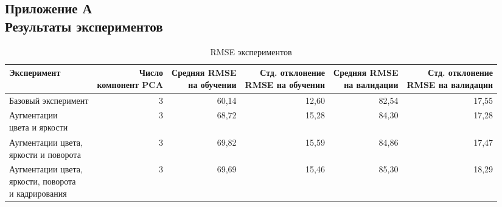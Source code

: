 \documentclass[a4paper,14pt]{article}
\begin{document}
    \begin{landscape}
	
		\begin{flushright}
			\section*{\normalsize \hfill Приложение А \\ \hfill Результаты экспериментов}
		\end{flushright}
		
    	\begin{table}[H]
			\caption{RMSE экспериментов}
			\label{tab:experiments_kpoints_rmse} 
			\begin{tabular}{lrrrrr}
				\toprule
				Эксперимент &  \makecell{Число\\ компонент PCA }&  \makecell{Средняя RMSE\\ на обучении} &  \makecell{Стд. отклонение\\ RMSE на обучении} &  \makecell{Средняя RMSE\\ на валидации} &  \makecell{Стд. отклонение\\ RMSE на валидации} \\
				\midrule
				Базовый эксперимент &                    3 &                     60,14 &                             12,60 &                      82,54 &                              17,55 \\ \hline
				\makecell{Аугментации\\ цвета и яркости} &                    3 &                     68,72 &                             15,28 &                      84,30 &                              17,28 \\ \hline
				\makecell{Аугментации цвета,\\ яркости и поворота} &                    3 &                     69,82 &                             15,59 &                      84,86 &                              17,47  \\ \hline
				\makecell{Аугментации цвета,\\ яркости, поворота\\ и кадрирования}&                    3 &                     69,69 &                             15,46 &                      85,30 &                              18,29 \\ 
				\bottomrule
			\end{tabular}
		\end{table}
	

\end{landscape}
\end{document}
